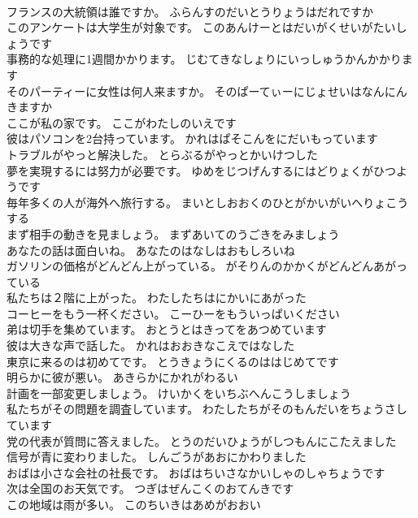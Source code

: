 \documentclass[8pt]{extreport}
\begin{document}
\begin{CJK}{UTF8}{min}
\\	フランスの大統領は誰ですか。	ふらんすのだいとうりょうはだれですか 
\\	このアンケートは大学生が対象です。	このあんけーとはだいがくせいがたいしょうです 
\\	事務的な処理に1週間かかります。	じむてきなしょりにいっしゅうかんかかります 
\\	そのパーティーに女性は何人来ますか。	そのぱーてぃーにじょせいはなんにんきますか 
\\	ここが私の家です。	ここがわたしのいえです 
\\	彼はパソコンを2台持っています。	かれはぱそこんをにだいもっています 
\\	トラブルがやっと解決した。	とらぶるがやっとかいけつした 
\\	夢を実現するには努力が必要です。	ゆめをじつげんするにはどりょくがひつようです 
\\	毎年多くの人が海外へ旅行する。	まいとしおおくのひとがかいがいへりょこうする 
\\	まず相手の動きを見ましょう。	まずあいてのうごきをみましょう 
\\	あなたの話は面白いね。	あなたのはなしはおもしろいね 
\\	ガソリンの価格がどんどん上がっている。	がそりんのかかくがどんどんあがっている 
\\	私たちは２階に上がった。	わたしたちはにかいにあがった 
\\	コーヒーをもう一杯ください。	こーひーをもういっぱいください 
\\	弟は切手を集めています。	おとうとはきってをあつめています 
\\	彼は大きな声で話した。	かれはおおきなこえではなした 
\\	東京に来るのは初めてです。	とうきょうにくるのははじめてです 
\\	明らかに彼が悪い。	あきらかにかれがわるい 
\\	計画を一部変更しましょう。	けいかくをいちぶへんこうしましょう 
\\	私たちがその問題を調査しています。	わたしたちがそのもんだいをちょうさしています 
\\	党の代表が質問に答えました。	とうのだいひょうがしつもんにこたえました 
\\	信号が青に変わりました。	しんごうがあおにかわりました 
\\	おばは小さな会社の社長です。	おばはちいさなかいしゃのしゃちょうです 
\\	次は全国のお天気です。	つぎはぜんこくのおてんきです 
\\	この地域は雨が多い。	このちいきはあめがおおい 

\end{CJK}
\end{document}
